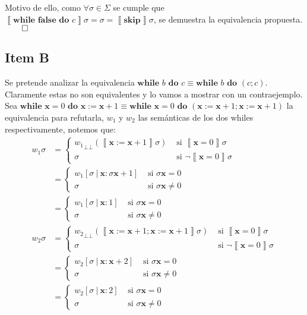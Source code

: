 \documentclass{article}
\newcommand{\sem}[1]{\left\llbracket #1\right\rrbracket}
\newcommand{\x}{\textbf{x}}
\newcommand{\bbot}{\bot\!\!\!\bot}
\newcommand{\cfalse}{\textbf{false}}
\newcommand{\cskip}{\textbf{skip}}
\newcommand{\cwhile}[2]{\textbf{while }#1\textbf{ do }#2}
\begin{document}
Motivo de ello, como $\forall \sigma \in \Sigma$ se cumple que $\sem{\cwhile{\cfalse}{c}}\sigma = \sigma = \sem{\cskip}\sigma$, se demuestra la equivalencia propuesta. $\qed$

\subsection*{Item B}
Se pretende analizar la equivalencia $\cwhile{b}{c} \equiv \cwhile{b}{(c;c)}$.
Claramente estas no son equivalentes y lo vamos a mostrar con un contraejemplo.
Sea $\cwhile{\x = 0}{\x := \x + 1} \equiv \cwhile{\x = 0}{(\x := \x + 1; \x := \x + 1)}$ la equivalencia para refutarla, $w_1$ y $w_2$ las semánticas de los dos whiles respectivamente, notemos que:
\begin{equation*}
  \begin{aligned}
    w_1 \sigma &= \begin{cases}
    {w_1}_{\bbot} (\sem{\x := \x + 1}\sigma) &\text{ si }\sem{\x = 0}\sigma \\ 
      \sigma &\text{ si }\neg\sem{\x = 0}\sigma 
    \end{cases} \\ 
             &= \begin{cases}
               w_1 [\sigma\ |\ \x : \sigma\x+1] &\text{ si } \sigma\x = 0 \\ 
               \sigma &\text{ si } \sigma\x \neq 0
             \end{cases} \\ 
             &= \begin{cases}
               w_1 [\sigma\ |\ \x : 1] &\text{ si }\sigma\x = 0 \\ 
               \sigma &\text{ si } \sigma\x \neq 0 
             \end{cases}
             \\ 
    w_2 \sigma &= \begin{cases}
      {w_2}_{\bbot} (\sem{\x := \x+1; \x := \x+1}\sigma) &\text{ si }\sem{\x = 0}\sigma \\ 
      \sigma &\text{ si }\neg\sem{\x = 0}\sigma 
    \end{cases} \\ 
               &= \begin{cases}
                 w_2 [\sigma\ |\ \x : \x+2] &\text{ si } \sigma\x = 0 \\ 
                 \sigma &\text{ si } \sigma\x \neq 0 
               \end{cases} \\ 
               &= \begin{cases}
                 w_2 [\sigma\ |\ \x : 2] &\text{ si }\sigma\x = 0 \\ 
                 \sigma &\text{ si } \sigma\x \neq 0
               \end{cases}
  \end{aligned}
\end{equation*}
\end{document}
